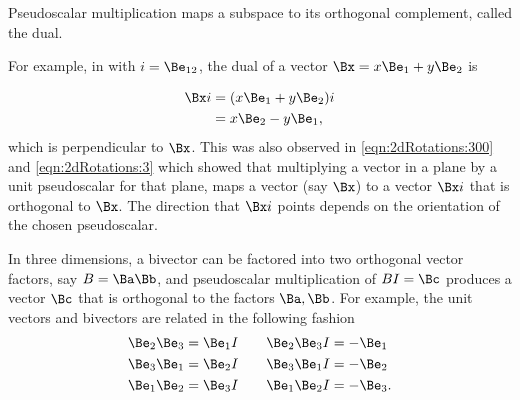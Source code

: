 %
%
Pseudoscalar multiplication maps a subspace to its orthogonal complement, called the dual.


For example, in  with \( i = \Be_{12} \), the dual of a vector \( \Bx = x \Be_1 + y \Be_2 \) is

\begin{equation}\label{eqn:dual:n}
\begin{aligned}
\Bx i 
&= (x \Be_1 + y \Be_2) i  \\
&= x \Be_2 - y \Be_1,
\end{aligned}
\end{equation}
which is perpendicular to \( \Bx \).
This was also observed in
\cref{eqn:2dRotations:300} and \cref{eqn:2dRotations:3} which showed that multiplying a vector in a plane by a unit pseudoscalar for that plane, maps a vector (say \( \Bx \)) to a vector \( \Bx i \) that is orthogonal to \( \Bx \).  The direction that \( \Bx i \) points depends on the orientation of the chosen pseudoscalar.
%
%

In three dimensions, a bivector can be factored into two orthogonal vector factors, say \( B = \Ba \Bb \), and
pseudoscalar multiplication of \( B I = \Bc \) produces a vector \( \Bc \) that is orthogonal to the factors \( \Ba, \Bb \).
For example, the unit vectors and bivectors are related in the following fashion
\begin{equation}\label{eqn:dual:1580}
\begin{aligned}
\Be_2 \Be_3 &= \Be_1 I \qquad \Be_2 \Be_3 I = -\Be_1 \\
\Be_3 \Be_1 &= \Be_2 I \qquad \Be_3 \Be_1 I = -\Be_2 \\
\Be_1 \Be_2 &= \Be_3 I \qquad \Be_1 \Be_2 I = -\Be_3.
\end{aligned}
\end{equation}

